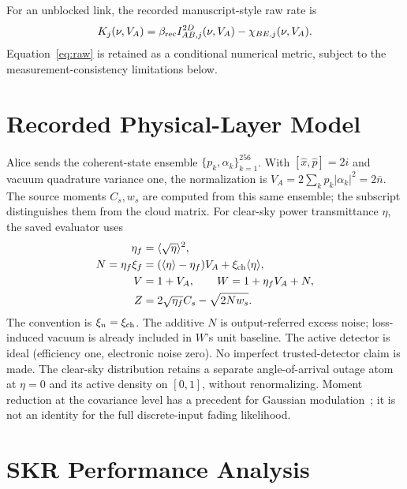 \documentclass[conference,a4paper]{IEEEtran}
\begin{document}
For an unblocked link, the recorded manuscript-style raw rate is
\begin{equation}
 K_j(\nu,V_A)=\beta_{\rm rec}I_{AB,j}^{2D}(\nu,V_A)-\chi_{BE,j}(\nu,V_A).
 \label{eq:raw}
\end{equation}
Equation~\eqref{eq:raw} is retained as a conditional numerical metric,
subject to the measurement-consistency limitations below.

\section{Recorded Physical-Layer Model}
Alice sends the coherent-state ensemble $\{p_k,\alpha_k\}_{k=1}^{256}$.
With $[\hat x,\hat p]=2i$ and vacuum quadrature variance one, the
normalization is $V_A=2\sum_kp_k|\alpha_k|^2=2\bar n$.
The source moments $C_s,w_s$ are computed from this same ensemble;
the subscript distinguishes them from the cloud matrix.
For clear-sky power transmittance $\eta$, the saved evaluator uses
\begin{align*}
 \eta_f&=\langle\sqrt\eta\rangle^2,\\
 N=\eta_f\xi_f&=(\langle\eta\rangle-\eta_f)V_A
                  +\xi_{\rm ch}\langle\eta\rangle,\\
 V&=1+V_A,\qquad W=1+\eta_fV_A+N,\\
 Z&=2\sqrt{\eta_f}C_s-\sqrt{2Nw_s}.
\end{align*}
The convention is $\xi_n=\xi_{\rm ch}$. The additive $N$ is
output-referred excess noise; loss-induced vacuum is already included
in $W$'s unit baseline. The active detector is ideal (efficiency one,
electronic noise zero). No imperfect trusted-detector claim is made.
The clear-sky distribution retains a separate angle-of-arrival outage
atom at $\eta=0$ and its active density on $[0,1]$, without renormalizing.
Moment reduction at the covariance level has a precedent for Gaussian
modulation~\cite{usenko2012}; it is not an identity for the full
discrete-input fading likelihood.

\section{SKR Performance Analysis}
\end{document}
